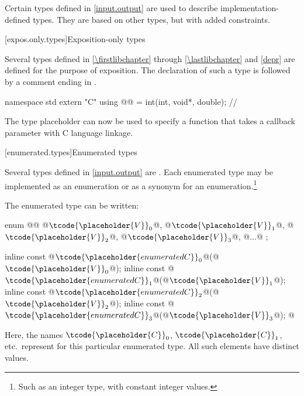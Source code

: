 \pnum
Certain types defined in \ref{input.output} are used to describe implementation-defined types.
%
They are based on other types, but with added constraints.

[expos.only.types]{Exposition-only types}

\pnum
Several types defined in \ref{\firstlibchapter} through \ref{\lastlibchapter}
and \ref{depr} are defined for the purpose of exposition.
The declaration of such a type is followed by a comment ending in \expos.
\begin{example}
\begin{codeblock}
namespace std {
  extern "C" using @@ = int(int, void*, double);  // \expos
}
\end{codeblock}
The type placeholder  can now be used to specify a function
that takes a callback parameter with C language linkage.
\end{example}

[enumerated.types]{Enumerated types}

\pnum
Several types defined in \ref{input.output} are
.
Each enumerated type may be implemented as an enumeration or as a synonym for
an enumeration.\footnote{Such as an integer type, with constant integer
values.}

\pnum
The enumerated type  can be written:

\begin{codeblock}
enum @@ { @$\tcode{\placeholder{V}}_{0}$@, @$\tcode{\placeholder{V}}_{1}$@, @$\tcode{\placeholder{V}}_{2}$@, @$\tcode{\placeholder{V}}_{3}$@, @$\ldots$@ };

inline const @$\tcode{\placeholder{enumerated C}}_{0}$@(@$\tcode{\placeholder{V}}_{0}$@);
inline const @$\tcode{\placeholder{enumerated C}}_{1}$@(@$\tcode{\placeholder{V}}_{1}$@);
inline const @$\tcode{\placeholder{enumerated C}}_{2}$@(@$\tcode{\placeholder{V}}_{2}$@);
inline const @$\tcode{\placeholder{enumerated C}}_{3}$@(@$\tcode{\placeholder{V}}_{3}$@);
  @\vdots@
\end{codeblock}

\pnum
Here, the names $\tcode{\placeholder{C}}_0$,
$\tcode{\placeholder{C}}_1$, etc.\ represent
for this particular enumerated type.
%
All such elements have distinct values.

